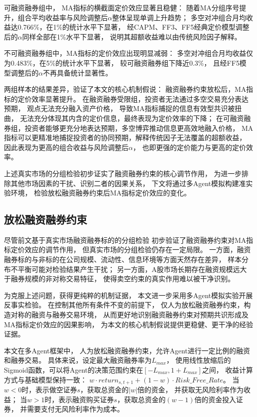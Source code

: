 可融资融券组中，
MA指标的横截面定价效应显著且稳健：
随着MA分组序号提升，组合平均收益率与风险调整后$\alpha$整体呈现单调上升趋势；
多空对冲组合月均收益达0.766\%，在1\%的统计水平下显著，
经CAPM、FF3、FF5经典定价模型调整后的$\alpha$同样全部在1\%水平下显著，
说明其超额收益难以由传统风险因子解释。

不可融资融券组中，MA指标的定价效应出现明显减弱：
多空对冲组合月均收益仅为0.483\%，在5\%的统计水平下显著，
较可融资融券组下降近0.3\%，
且经FF5模型调整后的$\alpha$不再具备统计显著性。

两组样本的结果差异，验证了本文的核心机制假说：
融资融券约束放松后，MA指标的定价效率显著提升。
在融资融券受限组，投资者无法通过多空交易充分表达预期，
观点无法充分融入资产价格，
导致MA指标捕捉的信息有效型共识被扭曲，
无法充分体现其内含的定价信息，最终表现为定价效率的下降；
在可融资融券组，投资者能够更充分地表达预期，多空博弈推动信息更高效地融入价格，
MA指标可以更精准地捕捉投资者的协同预期，解释传统因子无法覆盖的超额收益，
因此表现为更高的组合收益与风险调整后$\alpha$，
也即更强的定价能力与更高的定价效率。

上述真实市场的分组检验初步证实了融资融券约束的核心调节作用，
为进一步排除其他市场因素的干扰、识别二者的因果关系，
下文将通过多Agent模拟构建准实验环境，
检验放松融资融券约束后MA指标定价效应的变化。

 \FloatBarrier

\subsection{放松融资融券约束}

尽管前文基于真实市场融资融券标的的分组检验
初步验证了融资融券约束对MA指标定价效应的调节作用，
但真实市场的分组检验仍存在一定局限。
一方面，融资融券标的与非标的在公司规模、流动性、信息环境等方面天然存在差异，
样本分布不平衡可能对检验结果产生干扰；
另一方面，A股市场长期存在融资规模远大于融券规模的非对称交易特征\cite{褚2019margin}，
使得卖空约束的真实作用难以被干净识别。

为克服上述问题，获得更纯粹的机制证据，
本文进一步采用多Agent模拟实验开展反事实检验。
在控制其他所有条件不变的前提下，
仅人为放松融资融券约束，构造对称的融资与融券交易环境，
从而更好地识别融资融券约束对预期共识形成及MA指标定价效应的因果影响，
为本文的核心机制假说提供更稳健、更干净的经验证据。

本文在多Agent框架中，
人为放松融资融券约束，允许Agent进行一定比例的融资和融券交易。
具体来说，设定最大融资融券率为$L_{max}$，
使用线性放缩后的Sigmoid函数，可以将Agent的决策范围约束在$[-L_{max}, 1+L_{max}]$之间，
收益计算方式与基础模型保持一致：  
$w \cdot return_{s,t+1} + (1 - w) \cdot Risk\_Free\_Rate$。
当$w < 0$时，表示做空证券$s$，获取总资金的$|w|$倍的资金，
并获取无风险利率作为收益；
当$w > 1$时，表示融资购买证券$s$，获取总资金的$(w-1)$倍的资金投入证券，
并需要支付无风险利率作为成本。


